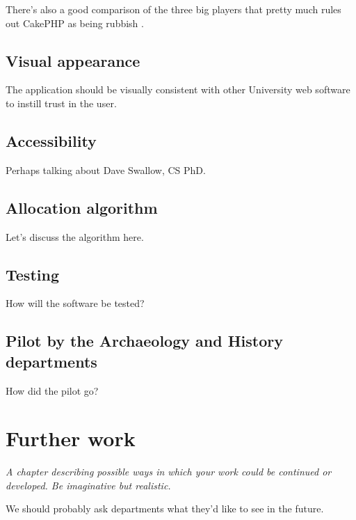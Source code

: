 \documentclass[]{scrartcl}
\begin{document}
There's also a good comparison of the three big players that pretty much rules out CakePHP as being rubbish \cite{EvalWebDevFrameworks_2009}.

\subsection{Visual appearance}

The application should be visually consistent with other University web software to instill trust in the user.


\subsection{Accessibility}

Perhaps talking about Dave Swallow, CS PhD.

\subsection{Allocation algorithm}

Let's discuss the algorithm here.

\subsection{Testing}

How will the software be tested?

\subsection{Pilot by the Archaeology and History departments}

How did the pilot go?

\section{Further work}

\textit{A chapter describing possible ways in which your work could be continued or developed. Be imaginative but realistic.}

We should probably ask departments what they'd like to see in the future.
\end{document}
